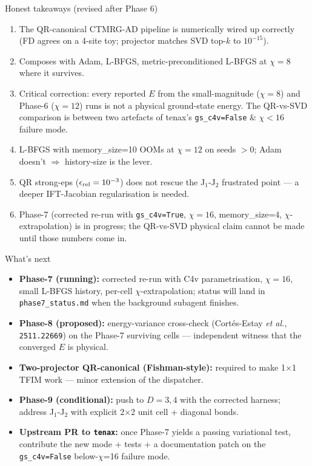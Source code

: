 \documentclass[11pt,aspectratio=169]{beamer}
\newcommand{\tenax}{\texttt{tenax}}
\begin{document}
\begin{frame}{Honest takeaways (revised after Phase 6)}
  \begin{enumerate}
    \item The QR-canonical CTMRG-AD pipeline is \alert{numerically wired up correctly} (FD agrees on a 4-site toy; projector matches SVD top-$k$ to $10^{-15}$).
    \item Composes with Adam, L-BFGS, metric-preconditioned L-BFGS at $\chi=8$ where it survives.
    \item \alert{Critical correction:} every reported $E$ from the small-magnitude ($\chi=8$) and Phase-6 ($\chi=12$) runs is \alert{not a physical ground-state energy}. The QR-vs-SVD comparison is between two artefacts of tenax's \texttt{gs\_c4v=False} \& $\chi<16$ failure mode.
    \item L-BFGS with memory\_size=10 OOMs at $\chi=12$ on seeds $>$0; Adam doesn't $\Rightarrow$ history-size is the lever.
    \item QR strong-eps ($\epsilon_{\rm rel}=10^{-3}$) does \alert{not} rescue the J$_1$-J$_2$ frustrated point --- a deeper IFT-Jacobian regularisation is needed.
    \item \alert{Phase-7 (corrected re-run with \texttt{gs\_c4v=True}, $\chi=16$, memory\_size=4, $\chi$-extrapolation) is in progress;} the QR-vs-SVD physical claim cannot be made until those numbers come in.
  \end{enumerate}
\end{frame}

\begin{frame}{What's next}
  \begin{itemize}
    \item \textbf{Phase-7 (running):} corrected re-run with C4v parametrisation, $\chi=16$, small L-BFGS history, per-cell $\chi$-extrapolation; status will land in \texttt{phase7\_status.md} when the background subagent finishes.
    \item \textbf{Phase-8 (proposed):} energy-variance cross-check (Cort\'es-Estay \emph{et al.}, \texttt{2511.22669}) on the Phase-7 surviving cells --- independent witness that the converged $E$ is physical.
    \item \textbf{Two-projector QR-canonical (Fishman-style):} required to make 1$\times$1 TFIM work --- minor extension of the dispatcher.
    \item \textbf{Phase-9 (conditional):} push to $D=3,4$ with the corrected harness; address J$_1$-J$_2$ with explicit 2$\times$2 unit cell + diagonal bonds.
    \item \textbf{Upstream PR to \tenax:} once Phase-7 yields a passing variational test, contribute the new mode + tests + a documentation patch on the \texttt{gs\_c4v=False} below-$\chi$=16 failure mode.
  \end{itemize}
\end{frame}
\end{document}
